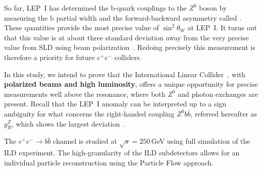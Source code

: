 So far, LEP~I has determined the b-quark couplings to the $Z^0$ boson by measuring the b partial width 
and the forward-backward asymmetry called \afb. 
These quantities provide the most precise value of $\sin^2\theta_W$ at LEP~I. It turns out that this value is at about three standard deviation away from the very precise value from SLD using beam polarization~\cite{bib:AfbSMFit}. 
Redoing precisely this measurement is therefore a priority for future $e^+e^-$ colliders. 


In this study, we intend to prove that the International Linear Collider~\cite{bib:ILC}, with \textbf{polarized beams and 
high luminosity}, offers a unique opportunity for precise measurements well above the resonance, where both $Z^0$ and photon exchanges are present. 
Recall that the LEP~I anomaly can be interpreted up to a sign ambiguity for what concerns the right‐handed coupling $Z^0 b\bar{b}$, referred 
hereafter as $g_R^Z$, which shows the largest deviation~\cite{bib:RSTOP}.  

\color{Blue}
The $e^+ e^-\to b\bar{b}$ channel is studied at $\sqrt{s}=250$\,GeV using full simulation of the ILD experiment.
\color{DarkSlateGray}
The high-granularity of the ILD subdetectors allows for an individual particle reconstruction using the Particle Flow approach.




